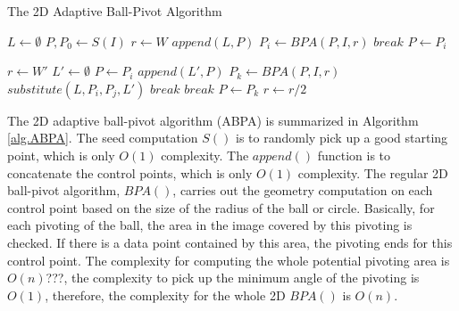 \begin{algorithm}
\caption{The 2D Adaptive Ball-Pivot Algorithm}
\label{alg.ABPA}
\begin{algorithmic}[1]
\State $L \leftarrow \emptyset$
\State $P, P_0 \leftarrow S(I) $ 
\State $r \leftarrow W$ 
  
   \State $append(L, P)$ 
   \State $P_i \leftarrow BPA(P, I, r)$ 
      \State $break$ 
   \EndIf
   \State $P \leftarrow P_i$ 
\EndWhile

\State $r \leftarrow W'$ 
 
      \State $L' \leftarrow \emptyset$
      \State $P \leftarrow P_i$
         \State $append(L', P)$ 
         \State $P_k \leftarrow BPA(P, I, r)$ 
	  
	    \State $substitute(L, P_i, P_j, L')$ 
	    \State $break$
	   
	    \State $break$
	 \EndIf
	 \State $P \leftarrow P_k$ 
      \EndWhile
   \EndFor
   \State $r \leftarrow r/2$  
\EndWhile
\EndProcedure
\end{algorithmic}
\end{algorithm}

The 2D adaptive ball-pivot algorithm (ABPA) is summarized in Algorithm \ref{alg.ABPA}. 
The seed computation $S()$ is to randomly pick up a good starting point, which
is only $O(1)$ complexity. The $append()$ function is to concatenate the control 
points, which is only $O(1)$ complexity. The regular 2D ball-pivot algorithm, $BPA()$,
carries out the geometry computation on each control point based on the size of the
radius of the ball or circle. Basically, for each pivoting of the ball, the area 
in the image covered by this pivoting is checked. If there is a data point contained
by this area, the pivoting ends for this control point. 
The complexity for computing the whole potential pivoting area is $O(n)$???, the
complexity to pick up the minimum angle of the pivoting is $O(1)$, therefore, the 
complexity for the whole 2D $BPA()$ is $O(n)$. 

